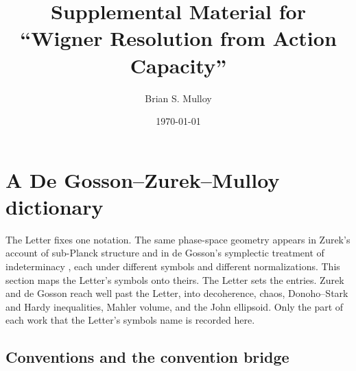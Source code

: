 \documentclass[%
  aps, amsmath, amssymb, onecolumn, 11pt
]{revtex4-2}
\begin{document}
\title{Supplemental Material for\\``Wigner Resolution from Action Capacity''}

\author{Brian S. Mulloy}

\date{\today}

\maketitle


\section{A De Gosson--Zurek--Mulloy dictionary}
\label{sec:dictionary}

The Letter fixes one notation. The same phase-space geometry appears in
Zurek's account of sub-Planck structure \cite{zurek2001} and in de
Gosson's symplectic treatment of indeterminacy
\cite{degosson2015indeterminacy, degosson2022polar, degosson2013qblobs,
degosson2005bullsci, degosson2009camel, degosson2024reconstruction},
each under different symbols and different normalizations. This section
maps the Letter's symbols onto theirs. The Letter sets the entries. Zurek
and de Gosson reach well past the Letter, into decoherence, chaos,
Donoho--Stark and Hardy inequalities, Mahler volume, and the John
ellipsoid. Only the part of each work that the Letter's symbols name is
recorded here.

\subsection{Conventions and the convention bridge}
\label{sec:conventions}
\end{document}
